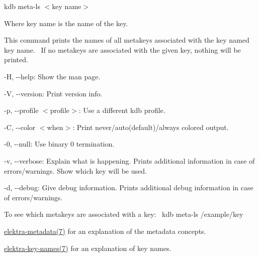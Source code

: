 {\ttfamily kdb meta-\/ls $<$key name$>$}

Where {\ttfamily key name} is the name of the key.

This command prints the names of all metakeys associated with the key named {\ttfamily key name}.~\newline
 If no metakeys are associated with the given key, nothing will be printed.~\newline



\begin{DoxyItemize}
\item {\ttfamily -\/H}, {\ttfamily -\/-\/help}\+: Show the man page.
\item {\ttfamily -\/V}, {\ttfamily -\/-\/version}\+: Print version info.
\item {\ttfamily -\/p}, {\ttfamily -\/-\/profile $<$profile$>$}\+: Use a different kdb profile.
\item {\ttfamily -\/C}, {\ttfamily -\/-\/color $<$when$>$}\+: Print never/auto(default)/always colored output.
\item {\ttfamily -\/0}, {\ttfamily -\/-\/null}\+: Use binary 0 termination.
\item {\ttfamily -\/v}, {\ttfamily -\/-\/verbose}\+: Explain what is happening. Prints additional information in case of errors/warnings. Show which key will be used.
\item {\ttfamily -\/d}, {\ttfamily -\/-\/debug}\+: Give debug information. Prints additional debug information in case of errors/warnings.
\end{DoxyItemize}

To see which metakeys are associated with a key\+:~\newline
 {\ttfamily kdb meta-\/ls /example/key}


\begin{DoxyItemize}
\item \hyperlink{doc_help_elektra-metadata_md}{elektra-\/metadata(7)} for an explanation of the metadata concepts.
\item \hyperlink{doc_help_elektra-key-names_md}{elektra-\/key-\/names(7)} for an explanation of key names. 
\end{DoxyItemize}